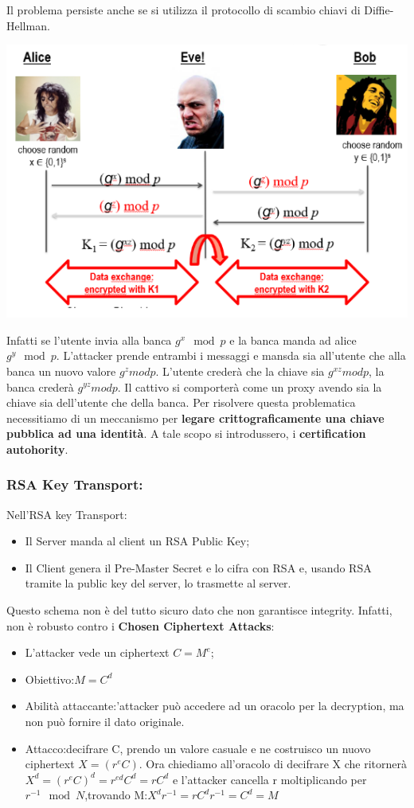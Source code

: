 \documentclass{book}
\theoremstyle{remark}
\begin{document}
Il problema persiste anche se si utilizza il protocollo di scambio chiavi di Diffie-Hellman\@.
\begin{center}
	\includegraphics[scale=0.6]{2021-12-05-19-03-04.png}
\end{center}
Infatti se l'utente invia alla banca \(g^x \mod{p}\) e la banca manda ad alice \(g^y \mod{p}\)\@. L'attacker prende entrambi i messaggi e mansda sia all'utente che alla banca un nuovo valore \(g^z mod p\)\@. L'utente crederà che la chiave sia \(g^{xz}mod p\), la banca crederà \(g^{yz}mod p\)\@. Il cattivo si comporterà come un proxy avendo sia la chiave sia dell'utente che della banca\@.\newline
Per risolvere questa problematica necessitiamo di un meccanismo per \textbf{legare crittograficamente una chiave pubblica ad una identità}\@. A tale scopo si introdussero, i \textbf{certification autohority}\@.
\subsubsection{RSA Key Transport:\@Details}
Nell'RSA key Transport:\begin{itemize}
	\item Il Server manda al client un RSA Public Key;\@
	\item Il Client genera il Pre-Master Secret e lo cifra con RSA e, usando RSA tramite la public key del server, lo trasmette al server\@.
\end{itemize}
Questo schema non è del tutto sicuro dato che non garantisce integrity\@. Infatti, non è robusto contro i \textbf{Chosen Ciphertext Attacks}:\begin{itemize}
	\item L'attacker vede un ciphertext \(C=M^e\);\@
	\item Obiettivo:\@trovare \(M=C^d\)
	\item Abilità attaccante:\@l'attacker può accedere ad un oracolo per la decryption, ma non può fornire il dato originale\@.
	\item Attacco:\@Per decifrare C, prendo un valore casuale e ne costruisco un nuovo ciphertext \(X=(r^eC)\)\@. Ora chiediamo all'oracolo di decifrare X che ritornerà \(X^d=(r^eC)^d=r^{ed}C^d=rC^d\) e l'attacker cancella r moltiplicando per \(r^{-1}\mod{N}\),trovando M:\(X^dr^{-1}=rC^dr^{-1}=C^d=M\)
\end{itemize}
\end{document}
